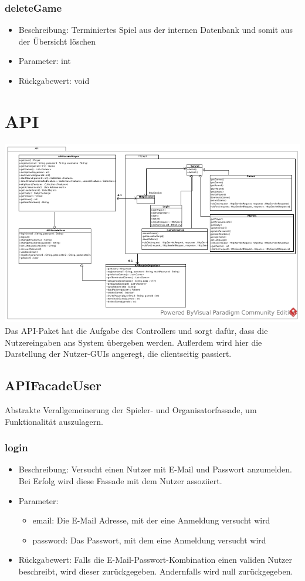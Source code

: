 \documentclass[a4paper]{scrreprt}
\begin{document}
    \subsubsection{deleteGame}
    \begin{itemize}
        \item Beschreibung: Terminiertes Spiel aus der internen Datenbank und somit aus der Übersicht löschen
        \item Parameter: int
        \item Rückgabewert: void
    \end{itemize}

    \section{API}
    \includegraphics[width=\textwidth]{img/package/api.pdf}
    Das API-Paket hat die Aufgabe des Controllers und sorgt dafür, dass die Nutzereingaben ans System übergeben werden. Außerdem wird hier die Darstellung der Nutzer-GUIs angeregt, die clientseitig passiert.

    \subsection{APIFacadeUser}
    Abstrakte Verallgemeinerung der Spieler- und Organisatorfassade, um Funktionalität auszulagern.
    \subsubsection{login}
    \begin{itemize}
        \item Beschreibung: Versucht einen Nutzer mit E-Mail und Passwort anzumelden. Bei Erfolg wird diese Fassade mit dem Nutzer assoziiert.
        \item Parameter:
        \begin{itemize}
            \item email: Die E-Mail Adresse, mit der eine Anmeldung versucht wird
            \item password: Das Passwort, mit dem eine Anmeldung versucht wird
        \end{itemize}
        \item Rückgabewert: Falls die E-Mail-Passwort-Kombination einen validen Nutzer beschreibt, wird dieser zurückgegeben. Andernfalls wird null zurückgegeben.
    \end{itemize}
\end{document}
